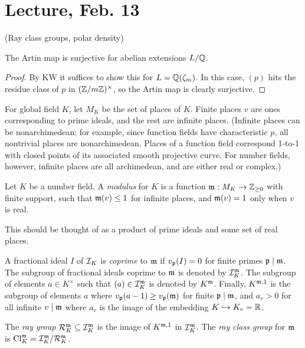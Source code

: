 \documentclass[11pt]{amsart}
\begin{document}
\section{Lecture, Feb. 13}

(Ray class groups, polar density)


\begin{prop}
    The Artin map is surjective for abelian extensions $L/\mathbb{Q}$.
\end{prop}


\begin{proof}
    By KW it suffices to show this for $L = \mathbb{Q}(\zeta_m)$. In this case, $(p)$ hits the residue class of $p$ in $(\mathbb{Z}/m\mathbb{Z})^{\times}$, so the Artin map is clearly surjective.
\end{proof}

For global field $K$, let $M_K$ be the set of places of $K$. Finite places $v$ are ones corresponding to prime ideals, and the rest are infinite places. (Infinite places can be nonarchimedean; for example, since function fields have characteristic $p$, all nontrivial places are nonarchimedean. Places of a function field correspond 1-to-1 with closed points of its associated smooth projective curve. For number fields, however, infinite places are all archimedean, and are either real or complex.)


\begin{defn}
    Let $K$ be a number field. A \emph{modulus} for $K$ is a function $\mathfrak{m}: M_K \to \mathbb{Z}_{\ge 0}$ with finite support, such that $\mathfrak{m}(v)\le 1$ for infinite places, and $\mathfrak{m}(v) = 1$ only when $v$ is real.
\end{defn}

This should be thought of as a product of prime ideals and some set of real places.

\begin{defn}
    A fractional ideal $I$ of $\mathcal{I}_K$ is \emph{coprime} to $\mathfrak{m}$ if $v_{\mathfrak{p}}(I) = 0$ for finite primes $\mathfrak{p}\mid \mathfrak{m}$. The subgroup of fractional ideals coprime to $\mathfrak{m}$ is denoted by $\mathcal{I}_{K}^{\mathfrak{m}}$. The subgroup of elements $a\in K^{\times}$ such that $(a)\in \mathcal{I}_K^{\mathfrak{m}}$ is denoted by $K^{\mathfrak{m}}$. Finally, $K^{\mathfrak{m}, 1}$ is the subgroup of elements $a$ where $v_{\mathfrak{p}}(a-1)\ge v_{\mathfrak{p}}(\mathfrak{m})$ for finite $\mathfrak{p}\mid\mathfrak{m}$, and $a_v>0$ for all infinite $v\mid \mathfrak{m}$ where $a_v$ is the image of the embedding $K\hookrightarrow K_v = \mathbb{R}$.
\end{defn}

\begin{defn}
    The \emph{ray group} $\mathcal{R}_K^{\mathfrak{m}}\subseteq \mathcal{I}_K^{\mathfrak{m}}$ is the image of $K^{\mathfrak{m},1}$ in $\mathcal{I}_K^{\mathfrak{m}}$. The \emph{ray class group} for $\mathfrak{m}$ is $\operatorname{Cl}_K^{\mathfrak{m}} = \mathcal{I}_K^{\mathfrak{m}} / \mathcal{R}_K^{\mathfrak{m}}$.
\end{defn}
\end{document}
